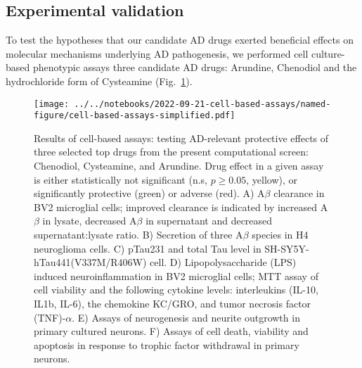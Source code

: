 \documentclass[letterpaper]{article}
\begin{document}
\subsection{Experimental validation}

To test the hypotheses that our candidate AD drugs exerted beneficial effects
on molecular mechanisms underlying AD pathogenesis, we performed cell
culture-based phenotypic assays  three candidate AD drugs: Arundine, Chenodiol
and the hydrochloride form of Cysteamine  (Fig.~\ref{fig:cell-based-assays}).

\begin{figure}
\texttt{[image: ../../notebooks/2022-09-21-cell-based-assays/named-figure/cell-based-assays-simplified.pdf]}
\caption{Results of cell-based assays: testing AD-relevant protective effects of three
  selected top drugs from the present computational screen: Chenodiol,
  Cysteamine, and Arundine.
  Drug effect in a given assay is either statistically not significant (n.s,
  $p \ge 0.05$, yellow), or significantly protective (green) or adverse (red).
  A) A$\beta$ clearance in BV2 microglial cells; improved clearance is indicated by
  increased A$\beta$ in lysate, decreased A$\beta$ in supernatant and
  decreased supernatant:lysate ratio.
  B) Secretion of three A$\beta$ species in H4 neuroglioma cells.
  C) pTau231 and total Tau level in SH-SY5Y-hTau441(V337M/R406W) cell.
  D) Lipopolysaccharide (LPS) induced neuroinflammation in BV2 microglial cells; MTT
  assay of cell viability and the following cytokine levels: interleukins
  (IL-10, IL1b, IL-6), the chemokine KC/GRO, and tumor necrosis factor
  (TNF)-$\alpha$.
  E) Assays of neurogenesis and neurite outgrowth in primary cultured neurons.
  F) Assays of cell death, viability and apoptosis in response to trophic
  factor withdrawal in primary neurons.
}
\label{fig:cell-based-assays}
\end{figure}
\end{document}
